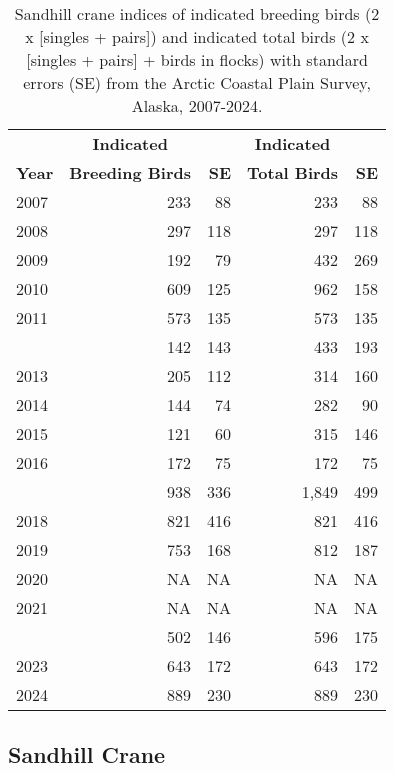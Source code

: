 \documentclass[
]{article}
\begin{document}
\begin{longtable}[t]{lrrrr}

\caption{\label{tbl-SACR}Sandhill crane indices of indicated breeding
birds (2 x {[}singles + pairs{]}) and indicated total birds (2 x
{[}singles + pairs{]} + birds in flocks) with standard errors (SE) from
the Arctic Coastal Plain Survey, Alaska, 2007-2024.}

\tabularnewline

\\
\toprule
\multicolumn{1}{c}{\textbf{ }} & \multicolumn{1}{c}{\textbf{Indicated}} & \multicolumn{1}{c}{\textbf{ }} & \multicolumn{1}{c}{\textbf{Indicated}} & \multicolumn{1}{c}{\textbf{ }} \\
\cmidrule(l{3pt}r{3pt}){2-2} \cmidrule(l{3pt}r{3pt}){4-4}
\textbf{Year} & \textbf{Breeding Birds} & \textbf{SE} & \textbf{Total Birds} & \textbf{SE}\\
\midrule
2007 & 233 & 88 & 233 & 88\\
2008 & 297 & 118 & 297 & 118\\
2009 & 192 & 79 & 432 & 269\\
2010 & 609 & 125 & 962 & 158\\
2011 & 573 & 135 & 573 & 135\\
\addlinespace
2012 & 142 & 143 & 433 & 193\\
2013 & 205 & 112 & 314 & 160\\
2014 & 144 & 74 & 282 & 90\\
2015 & 121 & 60 & 315 & 146\\
2016 & 172 & 75 & 172 & 75\\
\addlinespace
2017 & 938 & 336 & 1,849 & 499\\
2018 & 821 & 416 & 821 & 416\\
2019 & 753 & 168 & 812 & 187\\
2020 & NA & NA & NA & NA\\
2021 & NA & NA & NA & NA\\
\addlinespace
2022 & 502 & 146 & 596 & 175\\
2023 & 643 & 172 & 643 & 172\\
2024 & 889 & 230 & 889 & 230\\
\bottomrule

\end{longtable}

\endgroup{}

\newpage{}

\subsection*{Sandhill Crane}\label{sandhill-crane-2}
\end{document}
